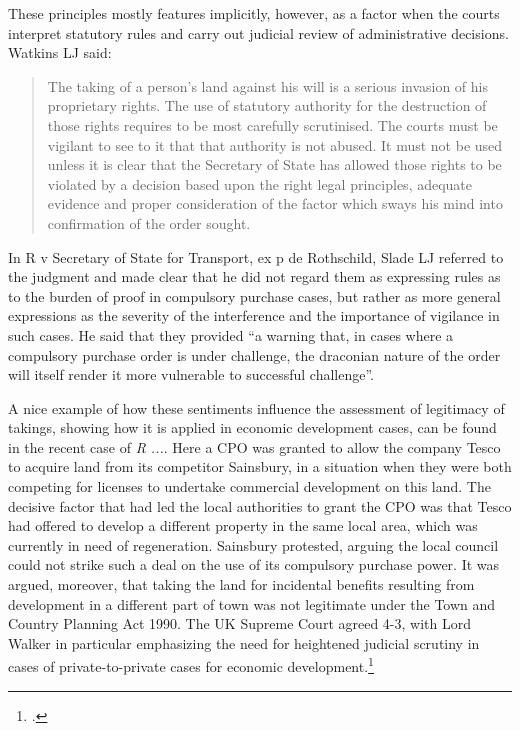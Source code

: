 These principles mostly features implicitly, however, as a factor when the courts interpret statutory rules and carry out judicial review of administrative decisions. Watkins LJ said:

\begin{quote}
The taking of a person's land against his will is a serious invasion of his proprietary rights. The use of statutory authority for the destruction of those rights requires to be most carefully scrutinised. The courts must be vigilant to see to it that that authority is not abused. It must not be used unless it is clear that the Secretary of State has allowed those rights to be violated by a decision based upon the right legal principles, adequate evidence and proper consideration of the factor which sways his mind into confirmation of the order sought.
\end{quote}

In R v Secretary of State for Transport, ex p de Rothschild, Slade LJ referred to the judgment and made clear that he did not regard them as expressing rules as to the burden of proof in compulsory purchase cases, but rather as more general expressions as the severity of the interference and the importance of vigilance in such cases. He said that they provided ``a warning that, in cases where a compulsory purchase order is under challenge, the draconian nature of the order will itself render it more vulnerable to successful challenge''.

A nice example of how these sentiments influence the assessment of legitimacy of takings, showing how it is applied in economic development cases, can be found in the recent case of {\it R ...}. Here a CPO was granted to allow the company Tesco to acquire land from its competitor Sainsbury, in a situation when they were both competing for licenses to undertake commercial development on this land. The decisive factor that had led the local authorities to grant the CPO was that Tesco had offered to develop a different property in the same local area, which was currently in need of regeneration. Sainsbury protested, arguing the local council could not strike such a deal on the use of its compulsory purchase power. It was argued, moreover, that taking the land for incidental benefits resulting from development in a different part of town was not legitimate under the Town and Country Planning Act 1990. The UK Supreme Court agreed 4-3, with Lord Walker in particular emphasizing the need for heightened judicial scrutiny in cases of private-to-private cases for economic development.\footcite[80-84]{sainsbury10}

